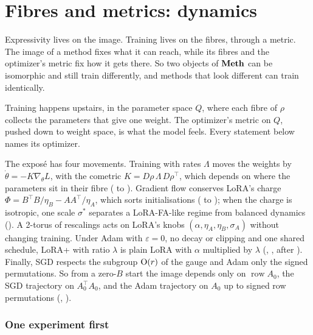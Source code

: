 \section{Fibres and metrics: dynamics}\label{sec:fibres}

Expressivity lives on the image. Training lives on the fibres, through a metric. The image of a method fixes what it can reach, while its fibres and the optimizer's metric fix how it gets there. So two objects of $\mathbf{Meth}$ can be isomorphic and still train differently, and methods that look different can train identically.

Training happens upstairs, in the parameter space $Q$, where each fibre of $\rho$ collects the parameters that give one weight. The optimizer's metric on $Q$, pushed down to weight space, is what the model feels. Every statement below names its optimizer.

The exposé has four movements. Training with rates $\Lambda$ moves the weights by $\dot\theta=-K\nabla_\theta L$, with the cometric $K=D\rho\,\Lambda\,D\rho^\top$, which depends on where the parameters sit in their fibre ( to ). Gradient flow conserves LoRA's charge $\Phi=B^\top B/\eta_B-AA^\top/\eta_A$, which sorts initialisations ( to ); when the charge is isotropic, one scale $\sigma^*$ separates a LoRA-FA-like regime from balanced dynamics (). A 2-torus of rescalings acts on LoRA's knobs $(\alpha,\eta_A,\eta_B,\sigma_A)$ without changing training. Under Adam with $\varepsilon=0$, no decay or clipping and one shared schedule, LoRA+ with ratio $\lambda$ is plain LoRA with $\alpha$ multiplied by $\lambda$ (, , after \citealp{schulman2025lora}). Finally, SGD respects the subgroup $\mathrm{O}(r)$ of the gauge and Adam only the signed permutations. So from a zero-$B$ start the image depends only on $\operatorname{row}A_0$, the SGD trajectory on $A_0^\top A_0$, and the Adam trajectory on $A_0$ up to signed row permutations (, ).

\subsubsection{One experiment first}\label{sec:fibres-hook}

